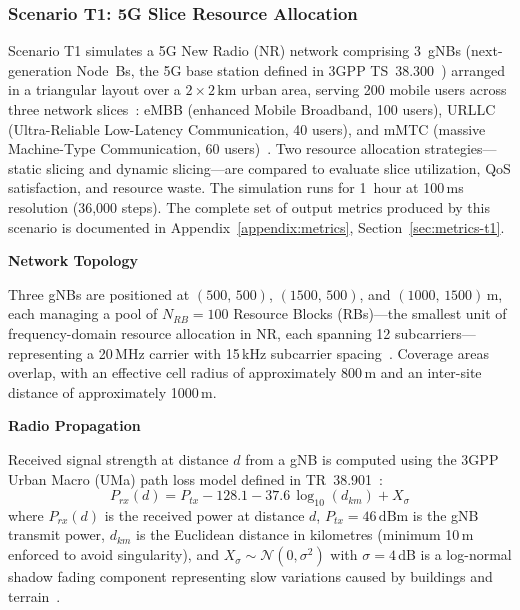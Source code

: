\subsubsection{Scenario T1: 5G Slice Resource Allocation}
\label{sec:scenario-t1}

Scenario T1 simulates a 5G New Radio (NR) network comprising 3~gNBs (next-generation Node~Bs, the 5G base station defined in 3GPP TS~38.300~\cite{3gpp_38300}) arranged in a triangular layout over a $2 \times 2\,\text{km}$ urban area, serving 200 mobile users across three network slices~\cite{3gpp_23501, network_slicing_survey}: eMBB (enhanced Mobile Broadband, 100 users), URLLC (Ultra-Reliable Low-Latency Communication, 40 users), and mMTC (massive Machine-Type Communication, 60 users)~\cite{telecom_challenges}. Two resource allocation strategies---static slicing and dynamic slicing---are compared to evaluate slice utilization, QoS satisfaction, and resource waste. The simulation runs for 1~hour at 100\,ms resolution (36,000 steps). The complete set of output metrics produced by this scenario is documented in Appendix~\ref{appendix:metrics}, Section~\ref{sec:metrics-t1}.

\medskip\noindent\textbf{Network Topology}

Three gNBs are positioned at $(500,\,500)$, $(1500,\,500)$, and $(1000,\,1500)$\,m, each managing a pool of $N_{RB} = 100$ Resource Blocks (RBs)---the smallest unit of frequency-domain resource allocation in NR, each spanning 12 subcarriers---representing a 20\,MHz carrier with 15\,kHz subcarrier spacing~\cite{3gpp_38300}. Coverage areas overlap, with an effective cell radius of approximately 800\,m and an inter-site distance of approximately 1000\,m.

\medskip\noindent\textbf{Radio Propagation}

Received signal strength at distance $d$ from a gNB is computed using the 3GPP Urban Macro (UMa) path loss model defined in TR~38.901~\cite{3gpp_38901}:
\begin{equation}
    P_{rx}(d) = P_{tx} - 128.1 - 37.6\,\log_{10}(d_{km}) + X_\sigma
    \label{eq:path_loss_t1}
\end{equation}
where $P_{rx}(d)$ is the received power at distance $d$, $P_{tx} = 46\,\text{dBm}$ is the gNB transmit power, $d_{km}$ is the Euclidean distance in kilometres (minimum 10\,m enforced to avoid singularity), and $X_\sigma \sim \mathcal{N}(0, \sigma^2)$ with $\sigma = 4$\,dB is a log-normal shadow fading component representing slow variations caused by buildings and terrain~\cite{3gpp_38901}.

